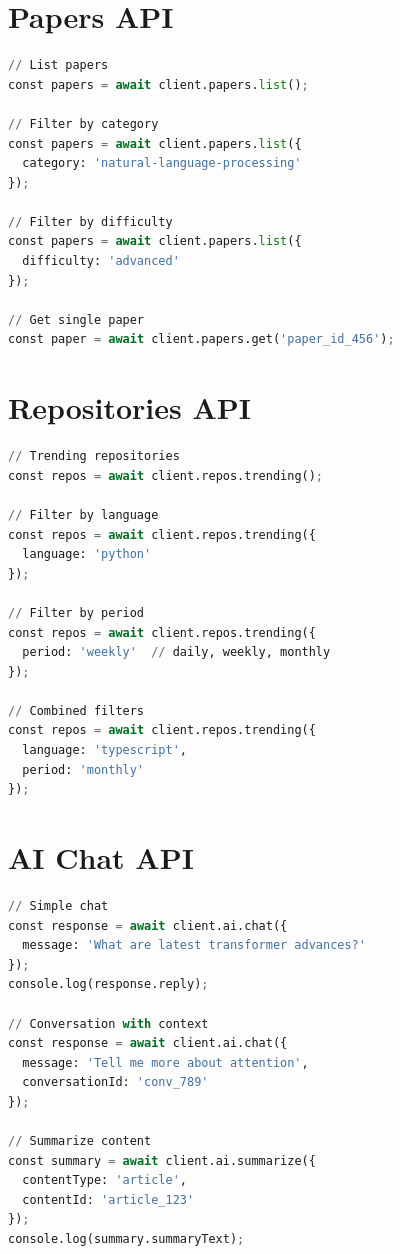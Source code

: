 \documentclass{report}
\begin{document}
\section{Papers API}

\begin{lstlisting}[language=Python]
// List papers
const papers = await client.papers.list();

// Filter by category
const papers = await client.papers.list({
  category: 'natural-language-processing'
});

// Filter by difficulty
const papers = await client.papers.list({
  difficulty: 'advanced'
});

// Get single paper
const paper = await client.papers.get('paper_id_456');
\end{lstlisting}

\section{Repositories API}

\begin{lstlisting}[language=Python]
// Trending repositories
const repos = await client.repos.trending();

// Filter by language
const repos = await client.repos.trending({
  language: 'python'
});

// Filter by period
const repos = await client.repos.trending({
  period: 'weekly'  // daily, weekly, monthly
});

// Combined filters
const repos = await client.repos.trending({
  language: 'typescript',
  period: 'monthly'
});
\end{lstlisting}

\section{AI Chat API}

\begin{lstlisting}[language=Python]
// Simple chat
const response = await client.ai.chat({
  message: 'What are latest transformer advances?'
});
console.log(response.reply);

// Conversation with context
const response = await client.ai.chat({
  message: 'Tell me more about attention',
  conversationId: 'conv_789'
});

// Summarize content
const summary = await client.ai.summarize({
  contentType: 'article',
  contentId: 'article_123'
});
console.log(summary.summaryText);
\end{lstlisting}
\end{document}
